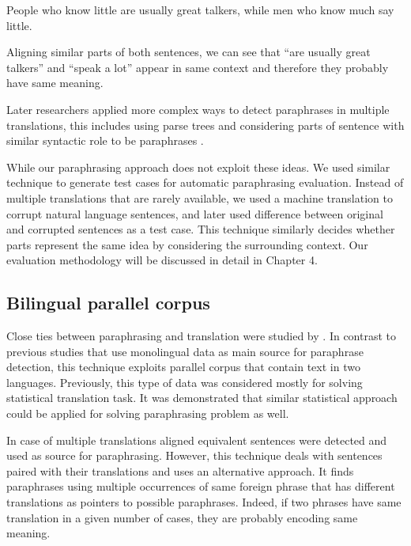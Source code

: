 \begin{center}
\begin{Large}
People who know little are usually great talkers, while men who know much say little.
\end{Large}
\end{center}

Aligning similar parts of both sentences, we can see that ``are usually great talkers'' and ``speak a lot'' appear in same context and therefore they probably have same meaning.

Later researchers applied more complex ways to detect paraphrases in multiple translations, this includes using parse trees and considering parts of sentence with similar syntactic role to be paraphrases \citep{pang2003syntax}.

While our paraphrasing approach does not exploit these ideas. We used similar technique to generate test cases for automatic paraphrasing evaluation. Instead of multiple translations that are rarely available, we used a machine translation to corrupt natural language sentences, and later used difference between original and corrupted sentences as a test case. This technique similarly decides whether parts represent the same idea by considering the surrounding context. Our evaluation methodology will be discussed in detail in Chapter 4.

\subsection{Bilingual parallel corpus}

Close ties between paraphrasing and translation were studied by \cite{Callison-Burch2007}. In contrast to previous studies that use monolingual data as main source for paraphrase detection, this technique exploits parallel corpus that contain text in two languages. Previously, this type of data was considered mostly for solving statistical translation task. It was demonstrated that similar statistical approach could be applied for solving paraphrasing problem as well.

In case of multiple translations aligned equivalent sentences were detected and used as source for paraphrasing. However, this technique deals with sentences paired with their translations and uses an alternative approach. It finds paraphrases using multiple occurrences of same foreign phrase that has different translations as pointers to possible paraphrases. Indeed, if two phrases have same translation in a given number of cases, they are probably encoding same meaning.

